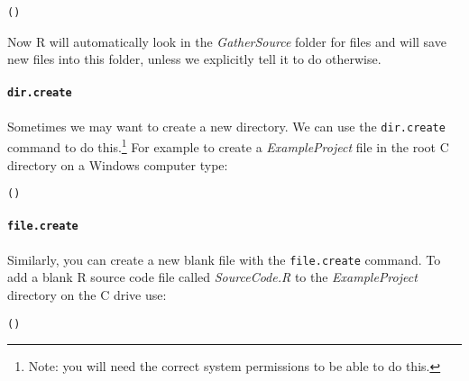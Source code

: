 {\begin{knitrout}
\color{fgcolor}\begin{kframe}
\begin{alltt}
()
\end{alltt}
\end{kframe}
\end{knitrout}


\noindent Now R will automatically look in the {\emph{GatherSource}} folder for files and will save new files into this folder, unless we explicitly tell it to do otherwise.

\paragraph{{\tt{dir.create}}}

Sometimes we may want to create a new directory. We can use the {\tt{dir.create}} command to do this.\footnote{Note: you will need the correct system permissions to be able to do this.} For example to create a {\emph{ExampleProject}} file in the root C directory on a Windows computer type:

\begin{knitrout}
\color{fgcolor}\begin{kframe}
\begin{alltt}
()
\end{alltt}
\end{kframe}
\end{knitrout}


\paragraph{{\tt{file.create}}}

Similarly, you can create a new blank file with the \texttt{file.create} command. To add a blank R source code file called {\emph{SourceCode.R}} to the {\emph{ExampleProject}} directory on the C drive use:

\begin{knitrout}
\color{fgcolor}\begin{kframe}
\begin{alltt}
()
\end{alltt}
\end{kframe}
\end{knitrout}


}
